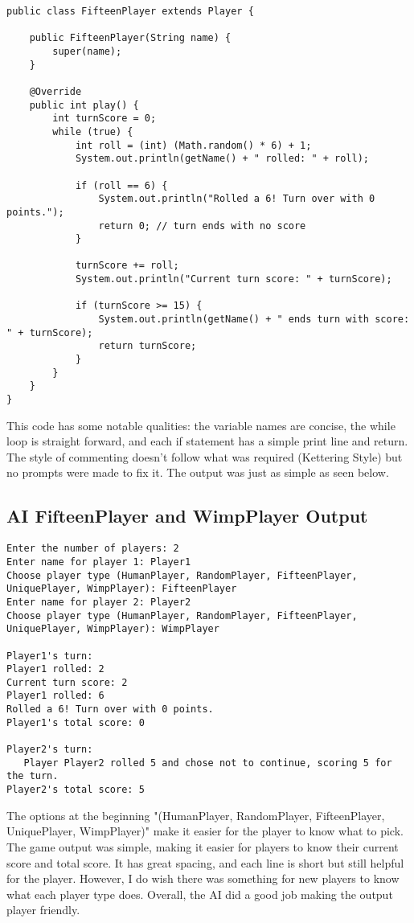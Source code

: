 \documentclass[a4paper,11pt]{article}
\begin{document}
\begin{lstlisting}
public class FifteenPlayer extends Player {

    public FifteenPlayer(String name) {
        super(name);
    }

    @Override
    public int play() {
        int turnScore = 0;
        while (true) {
            int roll = (int) (Math.random() * 6) + 1;
            System.out.println(getName() + " rolled: " + roll);

            if (roll == 6) {
                System.out.println("Rolled a 6! Turn over with 0 points.");
                return 0; // turn ends with no score
            }

            turnScore += roll;
            System.out.println("Current turn score: " + turnScore);

            if (turnScore >= 15) {
                System.out.println(getName() + " ends turn with score: " + turnScore);
                return turnScore;
            }
        }
    }
}
\end{lstlisting}
This code has some notable qualities: the variable names are concise, the while loop is straight forward, and each if statement has a simple print line and return. The style of commenting doesn't follow what was required (Kettering Style) but no prompts were made to fix it. The output was just as simple as seen below. 
\subsection*{AI FifteenPlayer and WimpPlayer Output}
\begin{verbatim}
Enter the number of players: 2
Enter name for player 1: Player1
Choose player type (HumanPlayer, RandomPlayer, FifteenPlayer, UniquePlayer, WimpPlayer): FifteenPlayer
Enter name for player 2: Player2
Choose player type (HumanPlayer, RandomPlayer, FifteenPlayer, UniquePlayer, WimpPlayer): WimpPlayer

Player1's turn:
Player1 rolled: 2
Current turn score: 2
Player1 rolled: 6
Rolled a 6! Turn over with 0 points.
Player1's total score: 0

Player2's turn:
   Player Player2 rolled 5 and chose not to continue, scoring 5 for the turn.
Player2's total score: 5

\end{verbatim}
The options at the beginning "(HumanPlayer, RandomPlayer, FifteenPlayer, UniquePlayer, WimpPlayer)" make it easier for the player to know what to pick. The game output was simple, making it easier for players to know their current score and total score. It has great spacing, and each line is short but still helpful for the player. However, I do wish there was something for new players to know what each player type does. Overall, the AI did a good job making the output player friendly. 
\end{document}
